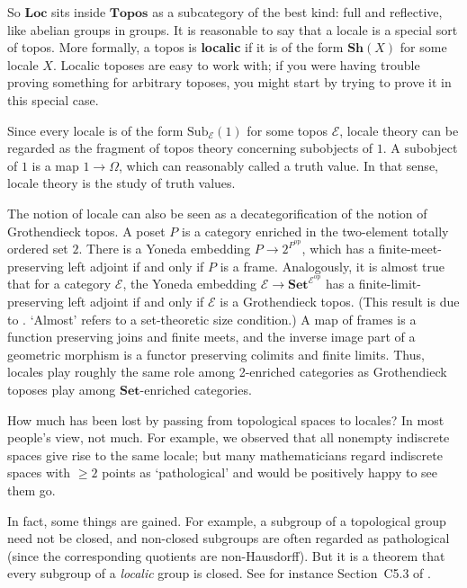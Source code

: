 \documentclass[12pt]{article}
\newcommand{\cat}[1]{\mathscr{#1}}
\newcommand{\fcat}[1]{\mathbf{#1}}
\newcommand{\op}{\mathrm{op}}
\newcommand{\Set}{\fcat{Set}}
\newcommand{\demph}[1]{\textbf{\textup{#1}}}
\newcommand{\E}{\cat{E}}
\newcommand{\Sub}{\mathrm{Sub}}
\newcommand{\Sh}{\fcat{Sh}}
\newcommand{\Topos}{\fcat{Topos}}
\newcommand{\Loc}{\fcat{Loc}}
\begin{document}
So $\Loc$ sits inside $\Topos$ as a subcategory of the best kind: full and
reflective, like abelian groups in groups.  It is reasonable to say
that a locale is a special sort of topos.  More formally, a topos is
\demph{localic} if it is of the form $\Sh(X)$ for some locale $X$.  Localic
toposes are easy to work with; if you were having trouble proving something
for arbitrary toposes, you might start by trying to prove it in this
special case.  

Since every locale is of the form $\Sub_\E(1)$ for some topos $\E$, locale
theory can be regarded as the fragment of topos theory concerning subobjects
of $1$.  A subobject of $1$ is a map $1 \to \Omega$, which can reasonably
called a truth value.  In that sense, locale theory is the study of truth
values. 

The notion of locale can also be seen as a decategorification of the notion of
Grothendieck topos.  A poset $P$ is a category enriched in the two-element
totally ordered set $2$.  There is a Yoneda embedding $P \to 2^{P^\op}$, which
has a finite-meet-preserving left adjoint if and only if $P$ is a frame.
Analogously, it is almost true that for a category $\E$, the Yoneda embedding
$\E \to \Set^{\E^\op}$ has a finite-limit-preserving left adjoint if and only
if $\E$ is a Grothendieck topos.  (This result is due to \citet{StrNT}.
`Almost' refers to a set-theoretic size condition.)  A map of frames is a
function preserving joins and finite meets, and the inverse image
part of a geometric morphism is a functor preserving colimits and finite
limits.  Thus, locales play roughly the same role among 2-enriched categories
as Grothendieck toposes play among $\Set$-enriched categories.

How much has been lost by passing from topological spaces to locales?  In most
people's view, not much.  For example, we observed that all nonempty
indiscrete spaces give rise to the same locale; but many mathematicians regard
indiscrete spaces with $\geq 2$ points as `pathological' and would be
positively happy to see them go.

In fact, some things are gained.  For example, a subgroup of a topological
group need not be closed, and non-closed subgroups are often regarded as
pathological (since the corresponding quotients are non-Hausdorff).  But it
is a theorem that every subgroup of a \emph{localic} group is closed.  See for
instance Section~C5.3 of \citet{JohSE}.
\end{document}
